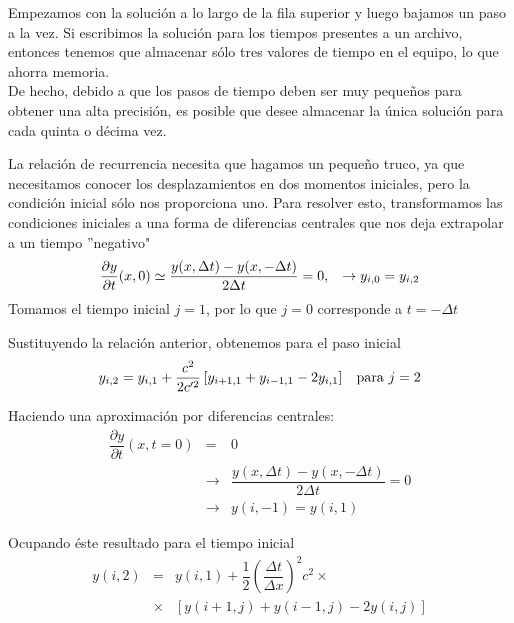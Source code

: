 \begin{frame}
Empezamos con la solución a lo largo de la fila superior y luego bajamos un paso a la vez. Si escribimos la solución para los tiempos presentes a un archivo, entonces tenemos que almacenar sólo tres valores de tiempo en el equipo, lo que ahorra memoria.
\\
\medskip
De hecho, debido a que los pasos de tiempo deben ser muy pequeños para obtener una alta precisión, es posible que desee almacenar la única solución para cada quinta o décima vez.
\end{frame}
\begin{frame}
La relación de recurrencia necesita que hagamos un pequeño truco, ya que necesitamos conocer los desplazamientos en dos momentos iniciales, pero la condición inicial sólo nos proporciona uno. Para resolver esto, transformamos las condiciones iniciales a una forma de diferencias centrales que nos deja extrapolar a un tiempo ''negativo"
\[ \dfrac{\partial y}{\partial t} (x,0) \simeq \dfrac{y(x,\Delta t) - y(x,-\Delta t)}{2 \Delta t} = 0, \hspace{0.3cm} \rightarrow y_{i,0} = y_{i,2} \]
Tomamos el tiempo inicial $j=1$, por lo que $j=0$ corresponde a $t= - \Delta t$
\end{frame}
\begin{frame}
Sustituyendo la relación anterior, obtenemos para el paso inicial
\[ y_{i,2} = y_{i,1} + \dfrac{c^{2}}{2 c'^{2}} \left[ y_{i+1,1} + y_{i-1,1} - 2 y_{i,1} \right] \hspace{0.3cm} \mbox{para } j=2 \]
\end{frame}
\begin{frame}
Haciendo una aproximación por diferencias centrales:
\begin{eqnarray*}
\dfrac{\partial y}{\partial t} (x,t=0) &=& 0 \\
& \longrightarrow & \dfrac{y(x, \Delta t) - y(x, - \Delta t)}{2 \Delta t} = 0 \\
& \longrightarrow & y(i,-1) = y(i,1)
\end{eqnarray*}
\end{frame}
\begin{frame}
Ocupando éste resultado para el tiempo inicial
\begin{eqnarray*}
y(i,2) &=& y(i,1) + \dfrac{1}{2} \left( \dfrac{\Delta t}{\Delta x} \right)^{2} c^{2} \times \\
& \times & [y(i+1,j) + y(i-1,j) - 2y(i,j)]
\end{eqnarray*}
\end{frame}
